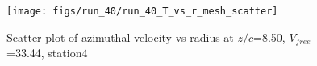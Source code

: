 \begin{figure}[H]
\centering
\texttt{[image: figs/run\_40/run\_40\_T\_vs\_r\_mesh\_scatter]}
\caption{Scatter plot of azimuthal velocity vs radius at $z/c$=8.50, $V_{free}$=33.44, station4}
\label{fig:run_40_T_vs_r_mesh_scatter}
\end{figure}


